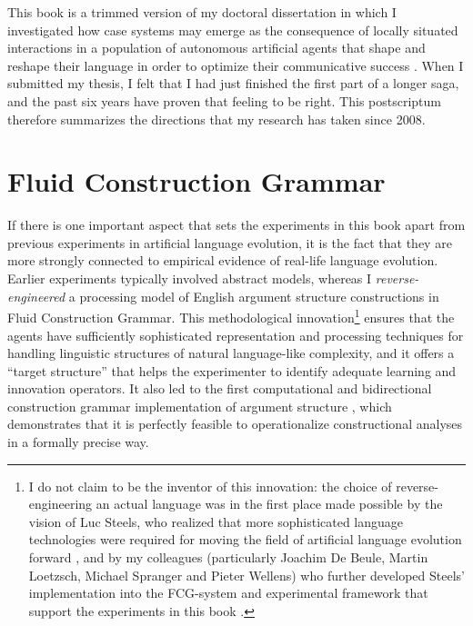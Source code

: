 
\label{c:conclusion}

This book is a trimmed version of my doctoral dissertation in which I investigated how case systems may emerge as the consequence of locally situated interactions in a population of autonomous artificial agents that shape and reshape their language in order to optimize their communicative success \citep{vantrijp08analogy}. When I submitted my thesis, I felt that I had just finished the first part of a longer saga, and the past six years have proven that feeling to be right. This postscriptum therefore summarizes the directions that my research has taken since 2008.

\section*{Fluid Construction Grammar}

If there is one important aspect that sets the experiments in this book apart from previous experiments in artificial language evolution, it is the fact that they are more strongly connected to empirical evidence of real-life language evolution. Earlier experiments typically involved abstract models, whereas I {\em reverse-engineered} a processing model of English argument structure constructions in Fluid Construction Grammar. This methodological innovation\footnote{I do not claim to be the inventor of this innovation: the choice of reverse-engineering an actual language was in the first place made possible by the vision of Luc Steels, who realized that more sophisticated language technologies were required for moving the field of artificial language evolution forward \citep{steels04constructivist}, and by my colleagues (particularly Joachim De Beule, Martin Loetzsch, Michael Spranger and Pieter Wellens) who further developed Steels' implementation into the FCG-system and experimental framework that support the experiments in this book \citep{loetzsch:08b}.} ensures that the agents have sufficiently sophisticated representation and processing techniques for handling linguistic structures of natural language-like complexity, and it offers a ``target structure'' that helps the experimenter to identify adequate learning and innovation operators. It also led to the first computational and bidirectional construction grammar implementation of argument structure \citep{vantrijp08argumentsstruktur}, which demonstrates that it is perfectly feasible to operationalize constructional analyses in a formally precise way.

